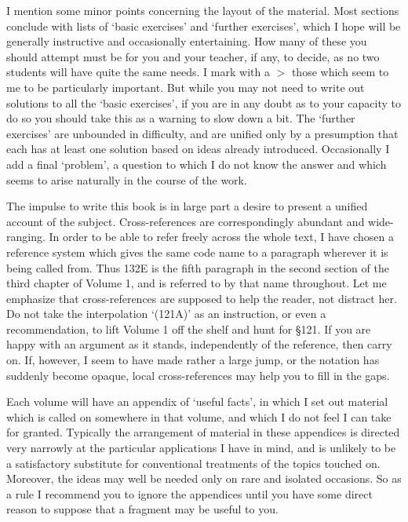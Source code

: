 I mention some minor points concerning the layout of the material.
Most sections conclude with lists of `basic exercises' and
`further exercises', which I hope will be generally instructive and
occasionally entertaining.   How many of these you should attempt must
be for you and your teacher, if any, to decide, as no two students will
have quite the same needs.   I mark with a $\pmb{>}$ those which seem to
me to be particularly important.   But while you may not need to write
out solutions to all the `basic exercises', if you are in any doubt
as to your capacity to do so you should take this as a warning to slow
down a bit.   The `further exercises' are unbounded in difficulty,
and are unified only by a presumption that each has at least one
solution based
on ideas already introduced.   Occasionally I add a final `problem',
a question to which I do not know the answer and which seems to arise
naturally in the course of the work.

The impulse to write this book is in large part a desire to present a
unified account of the subject.   Cross-references are correspondingly
abundant and wide-ranging.  In order to be able to refer freely across
the whole
text, I have chosen a reference system which gives the same code name to
a paragraph wherever it is being called from.   Thus 132E is the fifth
paragraph in the second section of the
third chapter of Volume 1, and is referred to by that name throughout.
Let me emphasize that cross-references are supposed to help the reader,
not distract her.   Do not take the interpolation `(121A)' as an
instruction, or even a recommendation, to lift Volume 1 off the shelf
and hunt for \S121.   If you are happy with an argument as it stands,
independently of the reference, then carry on.   If, however, I seem to
have made rather a large jump, or the notation has suddenly become
opaque, local cross-references may help you to fill in the gaps.

Each volume will have an appendix of `useful facts', in which I set
out material which is called on somewhere in that volume, and which I do
not feel I can take for granted.   Typically the arrangement of material
in these appendices is directed very narrowly at the particular
applications I have in mind, and is unlikely to be a satisfactory
substitute for conventional treatments of the topics touched on.
Moreover, the ideas may well be needed only on rare and isolated
occasions.   So as a rule I
recommend you to ignore the appendices until you have some
direct reason to suppose that a fragment may be useful to you.

